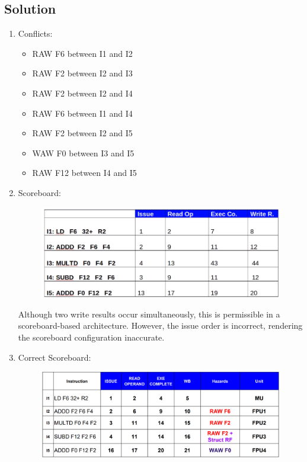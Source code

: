 \subsection*{Solution}
\begin{enumerate}
    \item Conflicts:
        \begin{itemize}
        \item RAW F6 between I1 and I2
        \item RAW F2 between I2 and I3
        \item RAW F2 between I2 and I4
        \item RAW F6 between I1 and I4
        \item RAW F2 between I2 and I5
        \item WAW F0 between I3 and I5
        \item RAW F12 between I4 and I5
        \end{itemize}
    \item Scoreboard:
        \begin{figure}[H]
            \centering
            \includegraphics[width=1\linewidth]{images/score.png}
        \end{figure}
        Although two write results occur simultaneously, this is permissible in a scoreboard-based architecture. 
        However, the issue order is incorrect, rendering the scoreboard configuration inaccurate.
    \item Correct Scoreboard:
        \begin{figure}[H]
            \centering
            \includegraphics[width=1\linewidth]{images/score1.png}
        \end{figure}
\end{enumerate}